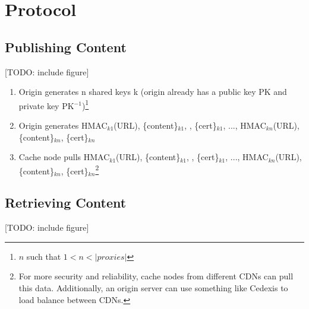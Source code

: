 \section{\system{} Protocol}
\label{sec:protocol}

\subsection{Publishing Content}

[TODO: include figure]

\begin{enumerate}
\item Origin generates n shared keys k (origin already has a public key PK and private key PK$^{-1}$)\footnote{$n$ such that $1 < n < |proxies|$} 
\item Origin generates HMAC$_{k1}$(URL), \{content\}$_{k1}$, , \{cert\}$_{k1}$, ..., HMAC$_{kn}$(URL), \{content\}$_{kn}$, \{cert\}$_{kn}$
\item Cache node pulls HMAC$_{k1}$(URL), \{content\}$_{k1}$, , \{cert\}$_{k1}$, ..., HMAC$_{kn}$(URL), \{content\}$_{kn}$, \{cert\}$_{kn}$\footnote{For more security and reliability, cache nodes from different CDNs can pull this data.  Additionally, an origin server can use something like Cedexis to load balance between CDNs.}
\end{enumerate}

\subsection{Retrieving Content}

[TODO: include figure]

